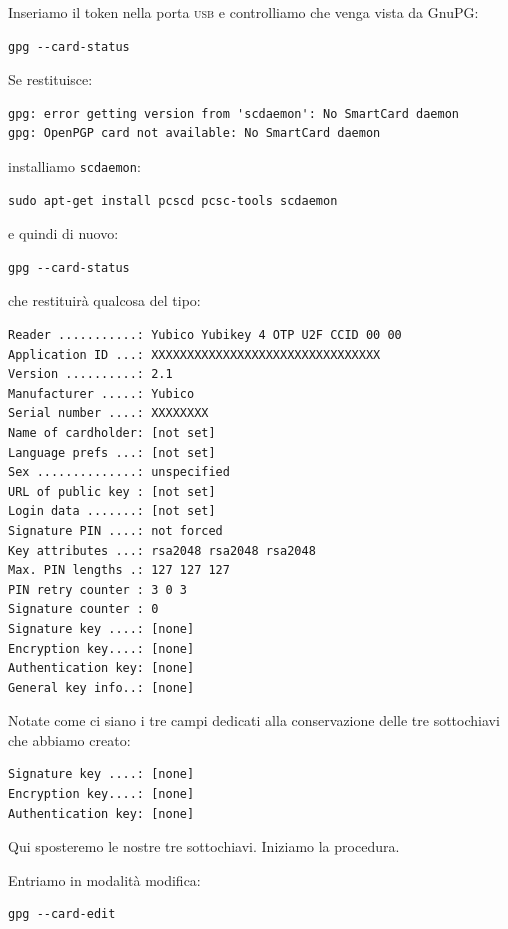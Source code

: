 \documentclass[a4paper,10pt]{article}
\begin{document}
Inseriamo il token nella porta \textsc{usb} e controlliamo che venga vista da GnuPG:

\begin{lstlisting}
gpg --card-status
\end{lstlisting}

Se restituisce:

\begin{lstlisting}
gpg: error getting version from 'scdaemon': No SmartCard daemon
gpg: OpenPGP card not available: No SmartCard daemon
\end{lstlisting}

installiamo \texttt{scdaemon}:

\begin{lstlisting}
sudo apt-get install pcscd pcsc-tools scdaemon
\end{lstlisting}

e quindi di nuovo:

\begin{lstlisting}
gpg --card-status
\end{lstlisting}

che restituirà qualcosa del tipo:

\begin{lstlisting}
Reader ...........: Yubico Yubikey 4 OTP U2F CCID 00 00
Application ID ...: XXXXXXXXXXXXXXXXXXXXXXXXXXXXXXXX
Version ..........: 2.1
Manufacturer .....: Yubico
Serial number ....: XXXXXXXX
Name of cardholder: [not set]
Language prefs ...: [not set]
Sex ..............: unspecified
URL of public key : [not set]
Login data .......: [not set]
Signature PIN ....: not forced
Key attributes ...: rsa2048 rsa2048 rsa2048
Max. PIN lengths .: 127 127 127
PIN retry counter : 3 0 3
Signature counter : 0
Signature key ....: [none]
Encryption key....: [none]
Authentication key: [none]
General key info..: [none]
\end{lstlisting}

Notate come ci siano i tre campi dedicati alla conservazione delle tre sottochiavi che abbiamo creato:

\begin{lstlisting}
Signature key ....: [none]
Encryption key....: [none]
Authentication key: [none]
\end{lstlisting}

Qui sposteremo le nostre tre sottochiavi. Iniziamo la procedura.

Entriamo in modalità modifica:

\begin{lstlisting}
gpg --card-edit
\end{lstlisting}
\end{document}
